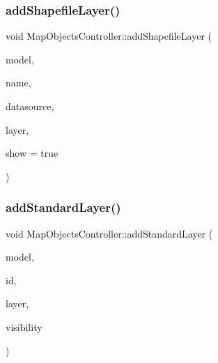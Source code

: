 \subsubsection{\texorpdfstring{addShapefileLayer()}{addShapefileLayer()}}
{\footnotesize\ttfamily void Map\+Objects\+Controller\+::add\+Shapefile\+Layer (\begin{DoxyParamCaption}\item[{int}]{model,  }\item[{Q\+String}]{name,  }\item[{std\+::shared\+\_\+ptr$<$ G\+D\+A\+L\+Dataset $>$}]{datasource,  }\item[{std\+::shared\+\_\+ptr$<$ Layer\+E\+S\+R\+I\+Shapefile $>$}]{layer,  }\item[{bool}]{show = {\ttfamily true} }\end{DoxyParamCaption})\hspace{0.3cm}{\ttfamily [protected]}}

\mbox{\label{class_map_objects_controller_a27a8392f267b0e7c1978de6c91916fc7}} 
\subsubsection{\texorpdfstring{addStandardLayer()}{addStandardLayer()}}
{\footnotesize\ttfamily void Map\+Objects\+Controller\+::add\+Standard\+Layer (\begin{DoxyParamCaption}\item[{int}]{model,  }\item[{\mbox{\hyperlink{class_map_objects_controller_a7233a767bfc22b69032e678b562253e2}{Layer\+Ids}}}]{id,  }\item[{std\+::shared\+\_\+ptr$<$ Layer $>$}]{layer,  }\item[{bool}]{visibility }\end{DoxyParamCaption})\hspace{0.3cm}{\ttfamily [protected]}}

\mbox{\label{class_map_objects_controller_aaf59f5257fbe71b23a1ca78f92a4931c}} 
